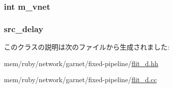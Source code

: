 \label{classflit__d_aff451e40c19f8624b8556d1524e0b76f}
\hypertarget{classflit__d_a1834cf79dfe7f6b9d971ceb81bac5716}{
\subsubsection[{m\_\-vnet}]{\setlength{\rightskip}{0pt plus 5cm}int {\bf m\_\-vnet}}}
\label{classflit__d_a1834cf79dfe7f6b9d971ceb81bac5716}
\hypertarget{classflit__d_a54c59332d73cfbff1539be34bdd8703b}{
\subsubsection[{src\_\-delay}]{ {\bf src\_\-delay}}}
\label{classflit__d_a54c59332d73cfbff1539be34bdd8703b}


このクラスの説明は次のファイルから生成されました:\begin{DoxyCompactItemize}
\item 
mem/ruby/network/garnet/fixed-\/pipeline/\hyperlink{flit__d_8hh}{flit\_\-d.hh}\item 
mem/ruby/network/garnet/fixed-\/pipeline/\hyperlink{flit__d_8cc}{flit\_\-d.cc}\end{DoxyCompactItemize}
